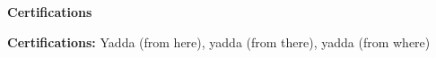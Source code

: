 \vspace{0.25mm}
\begin{center}
    \textbf{Certifications}
\end{center}

\textbf{Certifications:} Yadda (from here), yadda (from there), yadda (from where)\\
